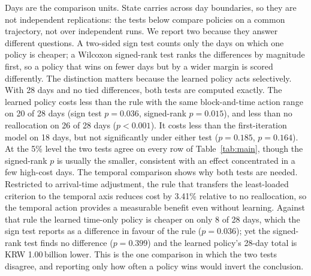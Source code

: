 \documentclass[a4paper]{llncs}
\begin{document}
\noindent
Days are the comparison
units. State carries across day boundaries, so they are not independent
replications: the tests below compare policies on a common trajectory,
not over independent runs. We report two because they answer different
questions. A two-sided sign test counts only the
days on which one policy is cheaper; a Wilcoxon signed-rank test ranks
the differences by magnitude first, so a policy that wins on fewer days
but by a wider margin is scored differently. The distinction matters
because the learned policy acts selectively. With 28 days
and no tied differences, both tests are computed exactly.
The learned policy costs less than the rule with the same
block-and-time action range on 20 of 28 days (sign test $p=0.036$,
signed-rank $p=0.015$), and less than no reallocation on 26 of 28 days
($p<0.001$). It costs less than the first-iteration model on 18 days,
but not significantly under either test ($p=0.185$, $p=0.164$). At the 5\% level the two tests agree on every
row of Table~\ref{tab:main}, though the signed-rank $p$ is usually the
smaller, consistent with an effect concentrated in a few high-cost days.
The temporal comparison shows why both tests are needed.
Restricted to arrival-time adjustment, the rule that transfers the
least-loaded criterion to the temporal axis reduces cost by 3.41\%
relative to no reallocation, so the temporal action provides a
measurable benefit even without learning. Against that rule the learned
time-only policy is cheaper on only 8 of 28 days, which the sign test
reports as a difference in favour of the rule ($p=0.036$); yet the
signed-rank test finds no difference ($p=0.399$) and the learned
policy's 28-day total is KRW 1.00\,billion lower. This is the one comparison
in which the two tests disagree, and reporting only how often a policy
wins would invert the conclusion.
\end{document}
